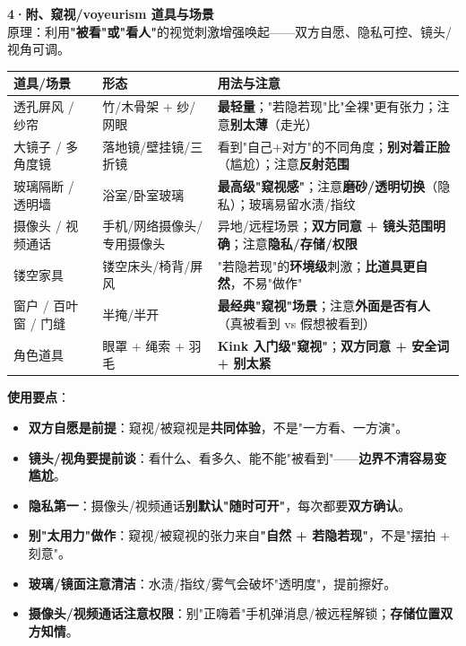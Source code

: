 \documentclass[12pt,UTF8,openany]{ctexbook}
\begin{document}
\textbf{4·附、窥视/voyeurism 道具与场景}\\
原理：利用\textbf{"被看"或"看人"}的视觉刺激增强唤起——双方自愿、隐私可控、镜头/视角可调。
\begin{tabularx}{\textwidth}{l X X}
\toprule
\textbf{道具/场景} & \textbf{形态} & \textbf{用法与注意} \\
\midrule
透孔屏风 / 纱帘 & 竹/木骨架 + 纱/网眼 & \textbf{最轻量}；"若隐若现"比"全裸"更有张力；注意\textbf{别太薄}（走光） \\
大镜子 / 多角度镜 & 落地镜/壁挂镜/三折镜 & 看到"自己+对方"的不同角度；\textbf{别对着正脸}（尴尬）；注意\textbf{反射范围} \\
玻璃隔断 / 透明墙 & 浴室/卧室玻璃 & \textbf{最高级"窥视感"}；注意\textbf{磨砂/透明切换}（隐私）；玻璃易留水渍/指纹 \\
摄像头 / 视频通话 & 手机/网络摄像头/专用摄像头 & 异地/远程场景；\textbf{双方同意 + 镜头范围明确}；注意\textbf{隐私/存储/权限} \\
镂空家具 & 镂空床头/椅背/屏风 & "若隐若现"的\textbf{环境级}刺激；\textbf{比道具更自然}，不易"做作" \\
窗户 / 百叶窗 / 门缝 & 半掩/半开 & \textbf{最经典"窥视"场景}；注意\textbf{外面是否有人}（真被看到 vs 假想被看到） \\
角色道具 & 眼罩 + 绳索 + 羽毛 & \textbf{Kink 入门级"窥视"}；\textbf{双方同意 + 安全词 + 别太紧} \\
\bottomrule
\end{tabularx}
\par\smallskip
\noindent\textbf{使用要点}：
\begin{itemize}[leftmargin=2em,itemsep=0.2em]
  \item \textbf{双方自愿是前提}：窥视/被窥视是\textbf{共同体验}，不是"一方看、一方演"。
  \item \textbf{镜头/视角要提前谈}：看什么、看多久、能不能"被看到"——\textbf{边界不清容易变尴尬}。
  \item \textbf{隐私第一}：摄像头/视频通话\textbf{别默认"随时可开"}，每次都要\textbf{双方确认}。
  \item \textbf{别"太用力"做作}：窥视/被窥视的张力来自\textbf{"自然 + 若隐若现"}，不是"摆拍 + 刻意"。
  \item \textbf{玻璃/镜面注意清洁}：水渍/指纹/雾气会破坏"透明度"，提前擦好。
  \item \textbf{摄像头/视频通话注意权限}：别"正嗨着"手机弹消息/被远程解锁；\textbf{存储位置双方知情}。
\end{itemize}
\end{document}
